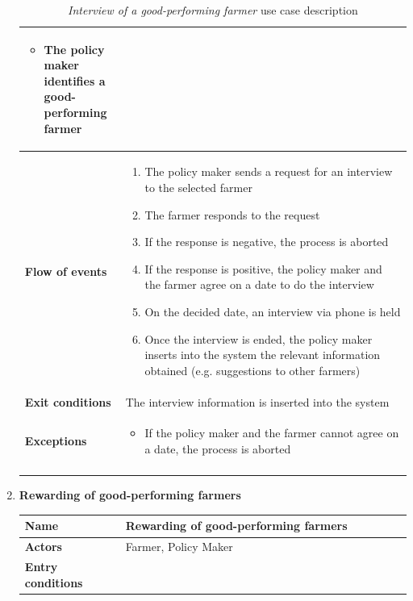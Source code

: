 \documentclass[10pt]{article}
\begin{document}
\begin{enumerate}[label=\textbf{UC\arabic*}]
\begin{longtable}{p{0.26\linewidth}p{0.75\linewidth}}
\begin{itemize}
                \item The policy maker identifies a good-performing farmer
            \end{itemize}\\
            \midrule
            \textbf{Flow of events} & 
            \begin{enumerate}
                \item The policy maker sends a request for an interview to the selected farmer
                \item The farmer responds to the request
                \item If the response is negative, the process is aborted
                \item If the response is positive, the policy maker and the farmer agree on a date to do the interview
                \item On the decided date, an interview via phone is held
                \item Once the interview is ended, the policy maker inserts into the system the relevant information obtained (e.g. suggestions to other farmers)
            \end{enumerate} \\
            \midrule
            \textbf{Exit conditions} & The interview information is inserted into the system\\
            \midrule
            \textbf{Exceptions} & 
            \begin{itemize}
                \item If the policy maker and the farmer cannot agree on a date, the process is aborted
            \end{itemize} \\
            \bottomrule
            \caption{\emph{Interview of a good-performing farmer} use case description}
        \end{longtable}
    \newpage
    \item \label{uc:uc7} \textbf{Rewarding of good-performing farmers}
        \begin{longtable}{p{0.26\linewidth}p{0.75\linewidth}}
            \toprule
            \textbf{Name} & \textbf{Rewarding of good-performing farmers} \\
            \midrule
            \textbf{Actors} & Farmer, Policy Maker\\
            \midrule
            \textbf{Entry conditions} & 
            \begin{itemize}

\end{itemize}
\end{longtable}
\end{enumerate}
\end{document}
